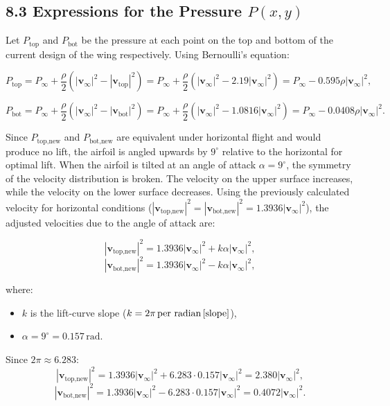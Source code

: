 \documentclass[12pt]{article}
\begin{document}
\subsection*{8.3 Expressions for the Pressure $P(x, y)$}
Let \( P_{\text{top}} \) and \( P_{\text{bot}} \) be the pressure at each point on the top and bottom of the current design of the wing respectively. Using Bernoulli's equation:

\[
P_{\text{top}} = P_{\infty} + \frac{\rho}{2}(|\mathbf{v}_{\infty}|^2 - |\mathbf{v}_{\text{top}}|^2) = P_{\infty} + \frac{\rho}{2}\left(|\mathbf{v}_{\infty}|^2 - 2.19 |\mathbf{v}_{\infty}|^2\right) = P_{\infty} - 0.595 \rho |\mathbf{v}_{\infty}|^2,
\]

\[
P_{\text{bot}} = P_{\infty} + \frac{\rho}{2}(|\mathbf{v}_{\infty}|^2 - |\mathbf{v}_{\text{bot}}|^2) = P_{\infty} + \frac{\rho}{2}\left(|\mathbf{v}_{\infty}|^2 - 1.0816 |\mathbf{v}_{\infty}|^2\right) = P_{\infty} - 0.0408 \rho |\mathbf{v}_{\infty}|^2.
\]

Since \( P_{\text{top,new}} \) and \( P_{\text{bot,new}} \) are equivalent under horizontal flight and would produce no lift, the airfoil is angled upwards by \( 9^\circ \) \cite{angle} relative to the horizontal for optimal lift. When the airfoil is tilted at an angle of attack \( \alpha = 9^\circ \), the symmetry of the velocity distribution is broken. The velocity on the upper surface increases, while the velocity on the lower surface decreases. Using the previously calculated velocity for horizontal conditions (\( |\mathbf{v}_{\text{top,new}}|^2 = |\mathbf{v}_{\text{bot,new}}|^2 = 1.3936 |\mathbf{v}_\infty|^2 \)), the adjusted velocities due to the angle of attack are:

\[
|\mathbf{v}_{\text{top,new}}|^2 = 1.3936 |\mathbf{v}_\infty|^2 + k \alpha |\mathbf{v}_\infty|^2,
\]
\[
|\mathbf{v}_{\text{bot,new}}|^2 = 1.3936 |\mathbf{v}_\infty|^2 - k \alpha |\mathbf{v}_\infty|^2,
\]

where:
\begin{itemize}
    \item \( k \) is the lift-curve slope (\( k = 2\pi \, \text{per radian} \, \cite{slope} \)),
    \item \( \alpha = 9^\circ = 0.157 \, \text{rad} \).
\end{itemize}

Since \( 2\pi \approx 6.283 \):
\[
|\mathbf{v}_{\text{top,new}}|^2 = 1.3936 |\mathbf{v}_\infty|^2 + 6.283 \cdot 0.157 |\mathbf{v}_\infty|^2 = 2.380 |\mathbf{v}_\infty|^2,
\]
\[
|\mathbf{v}_{\text{bot,new}}|^2 = 1.3936 |\mathbf{v}_\infty|^2 - 6.283 \cdot 0.157 |\mathbf{v}_\infty|^2 = 0.4072 |\mathbf{v}_\infty|^2.
\]
\end{document}
